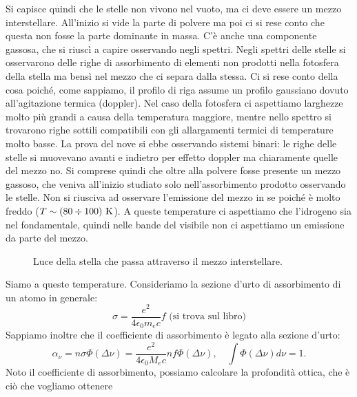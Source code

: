 Si capisce quindi che le stelle non vivono nel vuoto, ma ci deve essere un mezzo interstellare. All'inizio si vide la parte di polvere ma poi ci si rese conto che questa non fosse la parte dominante in massa. C'è anche una componente gassosa, che si riuscì a capire osservando negli spettri. Negli spettri delle stelle si osservarono delle righe di assorbimento di elementi non prodotti nella fotosfera della stella ma bensì nel mezzo che ci separa dalla stessa. Ci si rese conto della cosa poiché, come sappiamo, il profilo di riga assume un profilo gaussiano dovuto all'agitazione termica (doppler). Nel caso della fotosfera ci aspettiamo larghezze molto più grandi a causa della temperatura maggiore, mentre nello spettro si trovarono righe sottili compatibili con gli allargamenti termici di temperature molto basse. La prova del nove si ebbe osservando sistemi binari: le righe delle stelle si muovevano avanti e indietro per effetto doppler ma chiaramente quelle del mezzo no. Si comprese quindi che oltre alla polvere fosse presente un mezzo gassoso, che veniva all'inizio studiato solo nell'assorbimento prodotto osservando le stelle. Non si riusciva ad osservare l'emissione del mezzo in se poiché è molto freddo ($T\sim(80\div100)\text{ K}$). A queste temperature ci aspettiamo che l'idrogeno sia nel fondamentale, quindi nelle bande del visibile non ci aspettiamo un emissione da parte del mezzo. \\
\begin{figure}[t!]
    \centering
    \caption{Luce della stella che passa attraverso il mezzo interstellare.}
    \label{fig:tralenubi}
\end{figure}
Siamo a queste temperature. Consideriamo la sezione d'urto di assorbimento di un atomo in generale:
\[
\sigma = \frac{e^2}{4\epsilon_0m_ec} f \text{ (si trova sul libro)}
\]
Sappiamo inoltre che il coefficiente di assorbimento è legato alla sezione d'urto:
\[
    \alpha_\nu= n\sigma\Phi(\Delta \nu)=\frac{e^2}{4\epsilon_0 M_e c}nf\Phi(\Delta \nu), \quad \int \Phi(\Delta \nu)d\nu = 1.
\]
Noto il coefficiente di assorbimento, possiamo calcolare la profondità ottica, che è ciò che vogliamo ottenere
